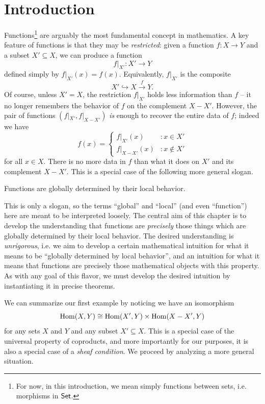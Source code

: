 \section{Introduction}

\startlecture[Aug 25, 2026]

Functions\footnote{For now, in this introduction, we mean simply functions between sets, i.e. morphisms in $\mathsf{Set}$.} are arguably the most fundamental concept in mathematics. A key feature of functions is that they may be \emph{restricted}: given a function $f : X \to Y$ and a subset $X' \subseteq X$, we can produce a function
\[f|_{X'} : X' \to Y\]
defined simply by $f|_{X'}(x) = f(x)$. Equivalently, $f|_{X'}$ is the composite
\[X' \hookrightarrow X \xrightarrow{f} Y.\]
Of course, unless $X' = X$, the restriction $f|_{X'}$ holds less information than $f$ -- it no longer remembers the behavior of $f$ on the complement $X - X'$. However, the pair of functions $(f|_{X'}, f|_{X-X'})$ \emph{is} enough to recover the entire data of $f$; indeed we have
\[f(x) = \begin{cases} f|_{X'}(x) &: x \in X' \\ f|_{X-X'}(x) &: x \notin X' \end{cases}\]
for all $x \in X$. There is no more data in $f$ than what it does on $X'$ and its complement $X - X'$. This is a special case of the following more general slogan.

\begin{slogan}\label{slogan:functions are globally determined by local behavior}
    Functions are globally determined by their local behavior.
\end{slogan}

This is only a slogan, so the terms ``global'' and ``local'' (and even ``function'') here are meant to be interpreted loosely. The central aim of this chapter is to develop the understanding that functions are \emph{precisely} those things which are globally determined by their local behavior. The desired understanding is \emph{unrigorous}, i.e. we aim to develop a certain mathematical intuition for what it means to be ``globally determined by local behavior'', and an intuition for what it means that functions are precisely those mathematical objects with this property. As with any goal of this flavor, we must develop the desired intuition by instantiating it in precise theorems.

We can summarize our first example by noticing we have an isomorphism
\[\operatorname{Hom}(X,Y) \cong \operatorname{Hom}(X',Y) \times \operatorname{Hom}(X - X', Y)\]
for any sets $X$ and $Y$ and any subset $X' \subseteq X$. This is a special case of the universal property of coproducts, and more importantly for our purposes, it is also a special case of a \emph{sheaf condition}. We proceed by analyzing a more general situation.

